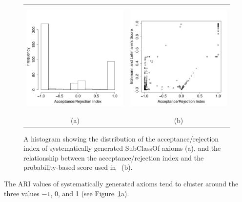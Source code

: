 \documentclass{llncs}
\begin{document}
\begin{figure}[t]
\begin{center}
  \begin{tabular}{cc}
    \includegraphics[height=2.25in]{ARI-hist} &
    \includegraphics[height=2.25in]{ARI-BLS} \\
    (a) & (b)
  \end{tabular}
\end{center}
\caption{A histogram showing the distribution of the acceptance/rejection index
  of systematically generated \textsf{SubClassOf} axioms (a),
  and the relationship between the acceptance/rejection index and the probability-based
  score used in~\cite{BuehmannLehmann2012} (b).}
\label{fig:ARI}
\end{figure}

The ARI values of systematically generated axioms tend to cluster
around the three values $-1$, 0, and 1 (see Figure~\ref{fig:ARI}a).
\end{document}
